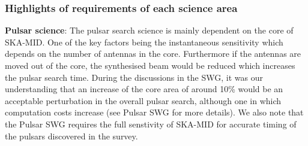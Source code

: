 \documentclass[sfheadings,a4paper,times,9pt,floats,floatfix]{article}
\begin{document}
\subsubsection{Highlights of requirements of each science area}

{\bf Pulsar science}: The pulsar search science is mainly dependent on
the core of SKA-MID. One of the key factors being the
instantaneous sensitivity which depends on the number of antennas in the core.
Furthermore if the antennas are moved out of the core, the synthesised beam would be
reduced which increases the pulsar search time. During the discussions in the SWG, it was
our understanding that an increase of the core area of around 10\%
would be an acceptable
perturbation in the overall pulsar search, although one in which
computation costs increase (see Pulsar SWG for more details). We also
note that the Pulsar SWG requires the full senstivity of SKA-MID for
accurate timing of the pulsars discovered in the survey.
\end{document}
